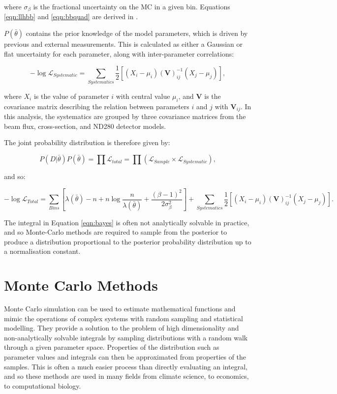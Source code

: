 where $\sigma_{\beta}$ is the fractional uncertainty on the MC in a given bin. Equations \ref{eqn:llhbb} and \ref{eqn:bbquad} are derived in \cite{beestonbarlow}.

$P(\bar{\theta})$ contains the prior knowledge of the model parameters, which is driven by previous and external measurements. This is calculated as either a Gaussian or flat uncertainty for each parameter, along with inter-parameter correlations:

\begin{equation}
-\log\mathcal{L}_{Systematic} = \sum_{Systematics} \frac{1}{2} [(X_i - \mu_i) (\textbf{V})_{ij}^{-1} (X_j - \mu_j)],
\end{equation}\label{eqn:systllh}

where $X_i$ is the value of parameter $i$ with central value $\mu_i$, and $\textbf{V}$ is the covariance matrix describing the relation between parameters $i$ and $j$ with $\textbf{V}_{ij}$. In this analysis, the systematics are grouped by three covariance matrices from the beam flux, cross-section, and ND280 detector models.

The joint probability distribution is therefore given by:

\begin{equation}
P(D|\bar{\theta}) P(\bar{\theta}) = \prod \mathcal{L}_{total} = \prod (\mathcal{L}_{Sample} \times \mathcal{L}_{Systematic}),
\end{equation}

 and so:

\begin{equation}
-\log\mathcal{L}_{Total} = \sum_{Bins}[\lambda(\bar{\theta}) - n + n \log \frac{n}{\lambda(\bar{\theta})}+ \frac{(\beta -1)^2}{2\sigma^{2}_\beta}] + \sum_{Systematics} \frac{1}{2} [(X_i - \mu_i) (\textbf{V})_{ij}^{-1} (X_j - \mu_j)].
\end{equation}

The integral in Equation \ref{eqn:bayes} is often not analytically solvable in practice, and so Monte-Carlo methods are required to sample from the posterior to produce a distribution proportional to the posterior probability distribution up to a normalisation constant. 

\section{Monte Carlo Methods}\label{sec:montecarlo}
Monte Carlo simulation can be used to estimate mathematical functions and mimic the operations of complex systems with random sampling and statistical modelling. They provide a solution to the problem of high dimensionality and non-analytically solvable integrals by sampling distributions with a random walk through a given parameter space. Properties of the distribution such as parameter values and integrals can then be approximated from properties of the samples. This is often a much easier process than directly evaluating an integral, and so these methods are used in many fields from climate science, to economics, to computational biology.


